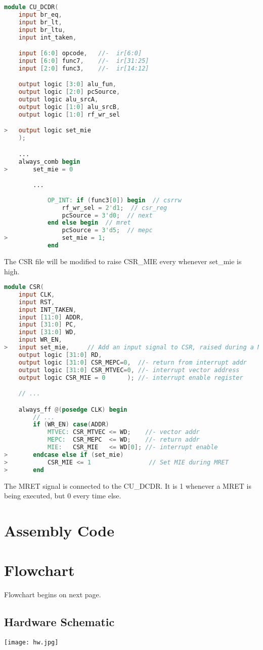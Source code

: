 \documentclass{article}
\begin{document}
\begin{lstlisting}[language=Verilog]                
module CU_DCDR(
    input br_eq, 
    input br_lt, 
    input br_ltu,
    input int_taken,

    input [6:0] opcode,   //-  ir[6:0]
    input [6:0] func7,    //-  ir[31:25]
    input [2:0] func3,    //-  ir[14:12] 

    output logic [3:0] alu_fun,
    output logic [2:0] pcSource,
    output logic alu_srcA,
    output logic [1:0] alu_srcB, 
    output logic [1:0] rf_wr_sel

>   output logic set_mie
    );

    ...
    always_comb begin 
>       set_mie = 0

        ...
            
            OP_INT: if (func3[0]) begin  // csrrw
                rf_wr_sel = 2'd1;  // csr_reg
                pcSource = 3'd0;  // next
            end else begin  // mret
                pcSource = 3'd5;  // mepc
>               set_mie = 1;
            end
\end{lstlisting}

The CSR file will be modified to raise CSR\_MIE every whenever set\_mie is high.

\begin{lstlisting}[language=Verilog]
module CSR(
    input CLK,
    input RST,
    input INT_TAKEN,           
    input [11:0] ADDR,
    input [31:0] PC,
    input [31:0] WD,
    input WR_EN,
>   input set_mie,     // Add an input signal to CSR, raised during a MRET
    output logic [31:0] RD,
    output logic [31:0] CSR_MEPC=0,  //- return from interrupt addr
    output logic [31:0] CSR_MTVEC=0, //- interrupt vector address  
    output logic CSR_MIE = 0      ); //- interrupt enable register

    // ...

    always_ff @(posedge CLK) begin
        // ...
        if (WR_EN) case(ADDR)
            MTVEC: CSR_MTVEC <= WD;    //- vector addr
            MEPC:  CSR_MEPC  <= WD;    //- return addr
            MIE:   CSR_MIE   <= WD[0]; //- interrupt enable
>       endcase else if (set_mie)
>           CSR_MIE <= 1                // Set MIE during MRET
>       end
\end{lstlisting}

The MRET signal is connected to the CU\_DCDR. It is 1 whenever a MRET is being executed, but 0 every time else.

\pagebreak

\section{Assembly Code}

\section{Flowchart}

Flowchart begins on next page.


\begin{landscape}
\section{Hardware Schematic}
\centering
\texttt{[image: hw.jpg]}
\end{landscape}
\end{document}
